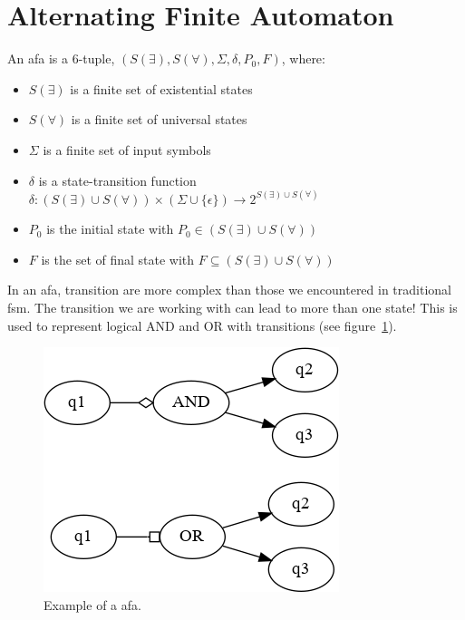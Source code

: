 \documentclass[12pt]{article}
\theoremstyle{definition}
\theoremstyle{definition}
\theoremstyle{remark}
\begin{document}

\section{Alternating Finite Automaton}


An \gls{afa} is a 6-tuple, $(S(\exists), S(\forall), \Sigma, \delta, P_0, F)$, where:

\begin{itemize}
\item $S(\exists)$ is a finite set of existential states
\item $S(\forall)$ is a finite set of universal states
\item $\Sigma$ is a finite set of input symbols
\item $\delta$ is a state-transition function $\delta: (S(\exists) \cup S(\forall)) \times (\Sigma \cup \{ \epsilon \}) \rightarrow 2^{S(\exists) \cup S(\forall)}$
\item $P_0$ is the initial state with $P_0 \in (S(\exists) \cup S(\forall))$
\item $F$ is the set of final state with $F \subseteq (S(\exists) \cup S(\forall))$
\end{itemize}

In an \gls{afa}, transition are more complex than those we encountered in traditional \gls{fsm}. The transition we are working with can lead to more than one state! This is used to represent logical AND and OR with transitions (see figure~\ref{afa}).\\

\begin{figure}
    \centering
    \includegraphics[scale=0.8]{graph/afa.png}
    \caption{Example of a \gls{afa}.}
    \label{afa}
\end{figure}
\end{document}

